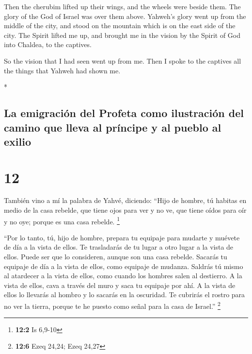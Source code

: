 \begin{paracol}{2}
\begin{otherlanguage}{english}
 Then the cherubim lifted up their wings, and the wheels
were beside them. The glory of the God of Israel was over them above.
 Yahweh's glory went up from the middle of the city, and
stood on the mountain which is on the east side of the city.
 The Spirit lifted me up, and brought me in the vision by
the Spirit of God into Chaldea, to the captives.

So the vision that I had seen went up from me.  Then I
spoke to the captives all the things that Yahweh had shown me.

\end{otherlanguage}

\switchcolumn[0]*

\hypertarget{la-emigraciuxf3n-del-profeta-como-ilustraciuxf3n-del-camino-que-lleva-al-pruxedncipe-y-al-pueblo-al-exilio}{%
\subsection{La emigración del Profeta como ilustración del camino que
lleva al príncipe y al pueblo al
exilio}\label{la-emigraciuxf3n-del-profeta-como-ilustraciuxf3n-del-camino-que-lleva-al-pruxedncipe-y-al-pueblo-al-exilio}}

\hypertarget{section-22}{%
\section{12}\label{section-22}}

 También vino a mí la palabra de Yahvé, diciendo:
 ``Hijo de hombre, tú habitas en medio de la casa rebelde,
que tiene ojos para ver y no ve, que tiene oídos para oír y no oye;
porque es una casa rebelde. \footnote{\textbf{12:2} Is 6,9-10}

 ``Por lo tanto, tú, hijo de hombre, prepara tu equipaje
para mudarte y muévete de día a la vista de ellos. Te trasladarás de tu
lugar a otro lugar a la vista de ellos. Puede ser que lo consideren,
aunque son una casa rebelde.  Sacarás tu equipaje de día a
la vista de ellos, como equipaje de mudanza. Saldrás tú mismo al
atardecer a la vista de ellos, como cuando los hombres salen al
destierro.  A la vista de ellos, cava a través del muro y
saca tu equipaje por ahí.  A la vista de ellos lo llevarás
al hombro y lo sacarás en la oscuridad. Te cubrirás el rostro para no
ver la tierra, porque te he puesto como señal para la casa de Israel.''
\footnote{\textbf{12:6} Ezeq 24,24; Ezeq 24,27}


\end{paracol}
